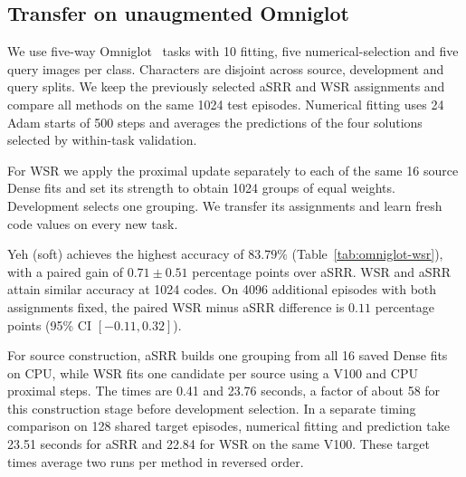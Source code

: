 \FloatBarrier
\subsection{Transfer on unaugmented Omniglot}
\label{sec:omniglot-wsr}

We use five-way Omniglot~\cite{lake2015human} tasks with 10 fitting,
five numerical-selection and five query images per class. Characters
are disjoint across source, development and query splits. We keep the
previously selected aSRR and WSR assignments and compare all methods
on the same 1024 test episodes. Numerical fitting uses 24 Adam starts
of 500 steps and averages the predictions of the four solutions
selected by within-task validation.

For WSR we apply the proximal update separately to each of the same 16
source Dense fits and set its strength to obtain 1024 groups of equal
weights. Development selects one grouping. We transfer its assignments
and learn fresh code values on every new task.


Yeh (soft) achieves the highest accuracy of $83.79\%$
(Table~\ref{tab:omniglot-wsr}), with a paired gain of $0.71\pm0.51$
percentage points over aSRR. WSR and aSRR attain similar accuracy at
1024 codes. On 4096 additional episodes with both assignments fixed,
the paired WSR minus aSRR difference is $0.11$ percentage points
(95\% CI $[-0.11, 0.32]$).

For source construction, aSRR builds one grouping from all 16 saved
Dense fits on CPU, while WSR fits one candidate per source using a V100
and CPU proximal steps. The times are 0.41 and 23.76 seconds, a factor
of about 58 for this construction stage before development selection.
In a separate timing comparison on 128 shared target episodes, numerical
fitting and prediction take 23.51 seconds for aSRR and 22.84 for WSR on
the same V100. These target times average two runs per method in
reversed order.


